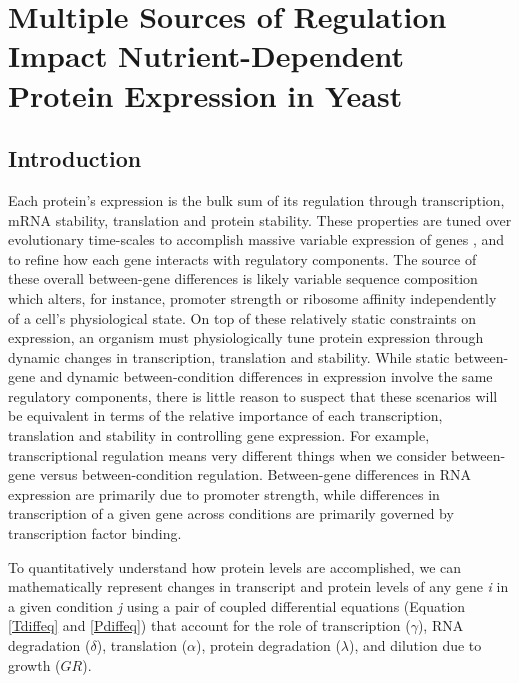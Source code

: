 \chapter{Multiple Sources of Regulation Impact Nutrient-Dependent Protein Expression in Yeast\label{ch:pt_compare}}

\section{Introduction}

Each protein's expression is the bulk sum of its regulation through transcription, mRNA stability, translation and protein stability. These properties are tuned over evolutionary time-scales to accomplish massive variable expression of genes \cite{Csardi:2015kx}, and to refine how each gene interacts with regulatory components.  The source of these overall between-gene differences is likely variable sequence composition which alters, for instance, promoter strength or ribosome affinity independently of a cell's physiological state. On top of these relatively static constraints on expression, an organism must physiologically tune protein expression through dynamic changes in transcription, translation and stability.  While static between-gene and dynamic between-condition differences in expression involve the same regulatory components, there is little reason to suspect that these scenarios will be equivalent in terms of the relative importance of each transcription, translation and stability in controlling gene expression.  For example, transcriptional regulation means very different things when we consider between-gene versus between-condition regulation.  Between-gene differences in RNA expression are primarily due to promoter strength, while differences in transcription of a given gene across conditions are primarily governed by transcription factor binding.  

 
To quantitatively understand how protein levels are accomplished, we can mathematically represent changes in transcript and protein levels of any gene \textit{i} in a given condition \textit{j} using a pair of coupled differential equations (Equation \ref{Tdiffeq} and  \ref{Pdiffeq}) that account for the role of transcription ($\gamma$), RNA degradation ($\delta$), translation ($\alpha$), protein degradation ($\lambda$), and dilution due to growth ($GR$).  

